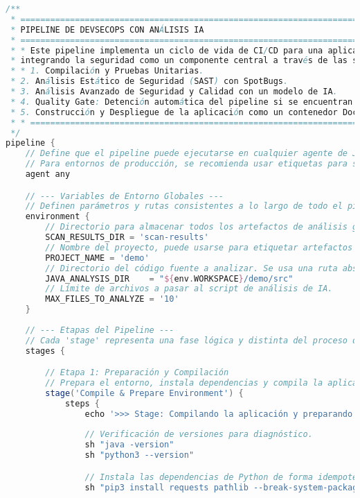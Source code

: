 \begin{lstlisting}[language=groovy, caption={Estructura completa del Jenkinsfile.}, label={lst:jenkinsfile}]
/**
 * =============================================================================
 * PIPELINE DE DEVSECOPS CON ANÁLISIS IA
 * =============================================================================
 * * Este pipeline implementa un ciclo de vida de CI/CD para una aplicación Java,
 * integrando la seguridad como un componente central a través de las siguientes fases:
 * * 1. Compilación y Pruebas Unitarias.
 * 2. Análisis Estático de Seguridad (SAST) con SpotBugs.
 * 3. Análisis Avanzado de Seguridad y Calidad con un modelo de IA.
 * 4. Quality Gate: Detención automática del pipeline si se encuentran vulnerabilidades críticas.
 * 5. Construcción y Despliegue de la aplicación como un contenedor Docker.
 * * =============================================================================
 */
pipeline {
    // Define que el pipeline puede ejecutarse en cualquier agente de Jenkins disponible.
    // Para entornos de producción, se recomienda usar etiquetas para seleccionar agentes específicos.
    agent any

    // --- Variables de Entorno Globales ---
    // Definen parámetros y rutas consistentes a lo largo de todo el pipeline.
    environment {
        // Directorio para almacenar todos los artefactos de análisis generados.
        SCAN_RESULTS_DIR = 'scan-results'
        // Nombre del proyecto, puede usarse para etiquetar artefactos o imágenes.
        PROJECT_NAME = 'demo'
        // Directorio del código fuente a analizar. Se usa una ruta absoluta para mayor robustez.
        JAVA_ANALYSIS_DIR    = "${env.WORKSPACE}/demo/src"
        // Límite de archivos a pasar al script de análisis de IA.
        MAX_FILES_TO_ANALYZE = '10'
    }
    
    // --- Etapas del Pipeline ---
    // Cada 'stage' representa una fase lógica y distinta del proceso de CI/CD.
    stages {

        // Etapa 1: Preparación y Compilación
        // Prepara el entorno, instala dependencias y compila la aplicación.
        stage('Compile & Prepare Environment') {
            steps {
                echo '>>> Stage: Compilando la aplicación y preparando el entorno...'
                
                // Verificación de versiones para diagnóstico.
                sh "java -version"
                sh "python3 --version"

                // Instala las dependencias de Python de forma idempotente.
                sh "pip3 install requests pathlib --break-system-packages || pip3 install requests pathlib || echo 'Dependencies already installed'"
                                

\end{lstlisting}
